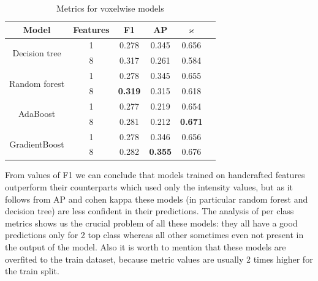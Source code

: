 \documentclass[twocolumn, a4paper]{article}
\theoremstyle{definition}
\begin{document}
\begin{table}[ht]
    \centering
    \begin{tabular}{|c|c|c|c|c|c| }
        \hline
        \textbf{Model}                 & \textbf{Features} & \textbf{F1}    & \textbf{AP}    & \( \mathbf{\varkappa} \) \\
        \hline
        \multirow{2}{*}{Decision tree} & 1                 & 0.278          & 0.345          & 0.656                    \\
                                       & 8                 & 0.317          & 0.261          & 0.584                    \\
        \hline
        \multirow{2}{*}{Random forest}
                                       & 1                 & 0.278          & 0.345          & 0.655                    \\
                                       & 8                 & \textbf{0.319} & 0.315          & 0.618                    \\
        \hline
        \multirow{2}{*}{AdaBoost}
                                       & 1                 & 0.277          & 0.219          & 0.654                    \\
                                       & 8                 & 0.281          & 0.212          & \textbf{0.671}           \\
        \hline
        \multirow{2}{*}{GradientBoost}
                                       & 1                 & 0.278          & 0.346          & 0.656                    \\
                                       & 8                 & 0.282          & \textbf{0.355} & 0.676                    \\
        \hline
    \end{tabular}
    \caption{Metrics for voxelwise models}
    \label{tab:voxelwise_metrics}
\end{table}

From values of F1 we can conclude that models trained on handcrafted features outperform their counterparts
which used only the intensity values, but as it follows from AP and cohen kappa these models (in particular random forest and decision tree)
are less confident in their predictions. The analysis of per class metrics shows us the crucial problem of all these models: they all have a good predictions
only for 2 top class whereas all other sometimes even not present in the output of the model. Also it is worth to mention that
these models are overfited to the train dataset, because metric values are usually 2 times higher for the train split.
\end{document}
